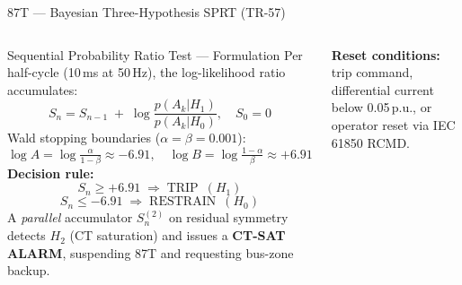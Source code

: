 \documentclass[aspectratio=169, 10pt]{beamer}
\begin{document}
\begin{frame}{87T — Bayesian Three-Hypothesis SPRT (TR-57)}
\begin{columns}[t]
\begin{block}{Sequential Probability Ratio Test — Formulation}
\footnotesize
Per half-cycle (10\,ms at 50\,Hz), the log-likelihood ratio
accumulates:
\[
  S_n = S_{n-1} \;+\; \log\frac{p(A_k | H_1)}{p(A_k | H_0)},
  \quad S_0 = 0
\]
Wald stopping boundaries ($\alpha=\beta=0.001$):
\[
  \log A = \log\!\tfrac{\alpha}{1-\beta}\approx -6.91,\quad
  \log B = \log\!\tfrac{1-\alpha}{\beta}\approx +6.91
\]
\textbf{Decision rule:}
\[
S_n \geq +6.91 \;\Rightarrow\; \text{TRIP}\enspace(H_1)
\]
\[
S_n \leq -6.91 \;\Rightarrow\; \text{RESTRAIN}\enspace(H_0)
\]
A \emph{parallel} accumulator $S_n^{(2)}$ on residual symmetry
detects $H_2$ (CT saturation) and issues a \textbf{CT-SAT ALARM},
suspending 87T and requesting bus-zone backup.
\end{block}
\vspace{4pt}
{\scriptsize \textbf{Reset conditions:} trip command, differential
current below 0.05\,p.u., or operator reset via IEC\,61850 RCMD.}


\end{columns}
\end{frame}
\end{document}
